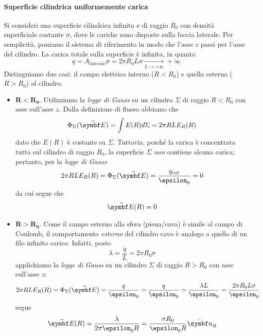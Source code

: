 \paragraph{Superficie cilindrica uniformemente carica}\label{supcilindrounifcarica}
Si consideri una superficie cilindrica infinita e di raggio $R_0$ con densità superficiale costante $\sigma$, dove le cariche sono disposte sulla faccia laterale. Per semplicità, poniamo il sistema di riferimento in modo che l'asse $z$ passi per l'asse del cilindro.
La carica totale sulla superficie è infinita, in quanto
\begin{equation}
	q=A_{laterale} \sigma=2\pi R_0 L \sigma\underset{L\to+\infty}{\longrightarrow}+\infty
\end{equation}
Distinguiamo due casi: il campo elettrico interno ($R<R_0$) e quello esterno ($R>R_0$) al cilindro.
\begin{itemize}
	\item $\mathbf{R<R_0}$. Utilizziamo la \textit{legge di Gauss} su un cilindro $\Sigma$ di raggio $R<R_0$ con asse sull'asse $z$. Dalla definizione di flusso abbiamo che
	\begin{equation*}
		\Phi_{\Sigma}(\vba{E})=\int E(R)d\Sigma=2\pi R L E_R(R)
	\end{equation*}
	dato che $E(R)$ è costante su $\Sigma$.
	Tuttavia, poiché la carica è concentrata tutta sul cilindro di raggio $R_0$, la superficie $\Sigma$ \textit{non} contiene alcuna carica; pertanto, per la \textit{legge di Gauss}
	\begin{equation*}
		2\pi R L E_R(R)=\Phi_{\Sigma}(\vba{E})=\frac{q_{int}}{\epsilon_0}=0
	\end{equation*}
	da cui segue che
	\begin{equation}
		\vba{E}(R)=0
	\end{equation}
	\item $\mathbf{R>R_0}$. Come il campo esterno alla sfera (piena/cava) è simile al campo di Coulomb, il comportamento \textit{esterno} del cilindro cavo è analogo a quello di un filo infinito carico. Infatti, posto
	\begin{equation*}
		\lambda=\frac{q}{L}=2\pi R_0 \sigma
	\end{equation*}
	applichiamo la \textit{legge di Gauss} su un cilindro $\Sigma$ di raggio $R>R_0$ con asse sull'asse $z$:
	\begin{equation*}
		2\pi R L E_R(R)=\Phi_{\Sigma}(\vba{E})=\frac{q}{\epsilon_0}=\frac{q}{\epsilon_0}=\frac{\lambda L}{\epsilon_0}=\frac{2\pi R_0 L \sigma}{\epsilon_0}
	\end{equation*}
	segue
	\begin{equation}
		\vba{E}(R)=\frac{\lambda}{2\pi \epsilon_0 R}=\frac{\sigma R_0}{\epsilon_0 R}\vbh{u}_R
	\end{equation}
\end{itemize}
